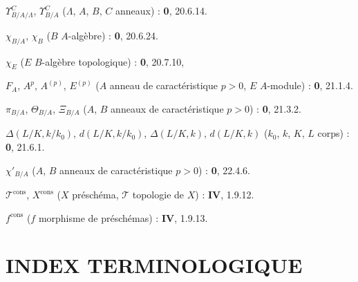 \clearpage
{}
$\Upsilon^C_{B/A/\Lambda}$, $\Upsilon^C_{B/A}$ ($\Lambda$, $A$, $B$, $C$ anneaux) : \textbf{0}, 20.6.14.\par
$\chi_{B/A}$, $\chi_B$ ($B$ $A$-algèbre) : \textbf{0}, 20.6.24.\par
$\chi_E$ ($E$ $B$-algèbre topologique) : \textbf{0}, 20.7.10,\par
$F_A$, $A^p$, $A^{(p)}$, $E^{(p)}$ ($A$ anneau de caractéristique $p>0$, $E$ $A$-module) : \textbf{0}, 21.1.4.\par
$\pi_{B/A}$, $\Theta_{B/A}$, $\Xi_{B/A}$ ($A$, $B$ anneaux de caractéristique $p>0$) : \textbf{0}, 21.3.2.\par
$\Delta(L/K,k/k_0)$, $d(L/K,k/k_0)$, $\Delta(L/K,k)$, $d(L/K,k)$ ($k_0$, $k$, $K$, $L$ corps) : \textbf{0}, 21.6.1.\par
$\chi'_{B/A}$ ($A$, $B$ anneaux de caractéristique $p>0$) : \textbf{0}, 22.4.6.\par
$\mathscr T^{\mathrm{cons}}$, $X^{\mathrm{cons}}$ ($X$ préschéma, $\mathscr T$ topologie de $X$) : \textbf{IV}, 1.9.12.\par
$f^{\mathrm{cons}}$ ($f$ morphisme de préschémas) : \textbf{IV}, 1.9.13.\par

\clearpage
{}
{}
\section*{INDEX TERMINOLOGIQUE}

